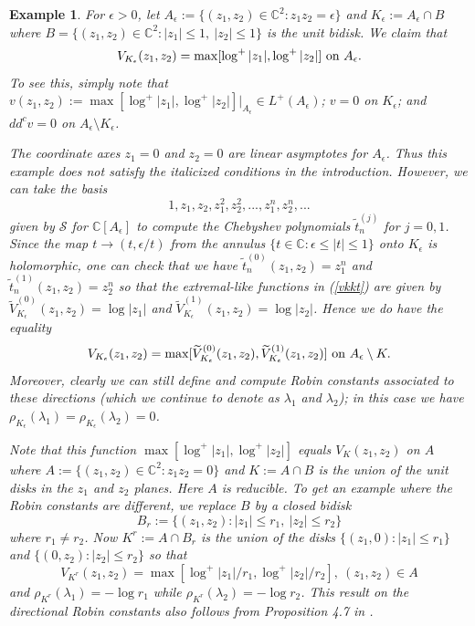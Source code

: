 \documentclass[12pt]{article}
\numberwithin{equation}{section}
\newtheorem{Example}[theorem]{Example}
\newenvironment{example}{\begin{Example}\rm}{\end{Example}}
\newcommand{\C}{\mathbb{C}}
\renewcommand{\tilde}{\widetilde}
\newcommand{\calS}{\mathcal{S}}
\begin{document}
\begin{example}  For $\epsilon >0$, let $A_{\epsilon}:=\{(z_1,z_2)\in \C^2: z_1 z_2 = \epsilon\}$ and $K_{\epsilon}:=A_{\epsilon}\cap B$ where $B=\{(z_1,z_2)\in \C^2: |z_1|\leq 1, \ |z_2|\leq  1\}$ is the unit bidisk. We claim that 
$$V_{K_{\epsilon}}(z_1,z_2) = \max[ \log^+|z_1|, \log^+|z_2|] \ \hbox{on}  \ A_{\epsilon}.$$ To see this, simply note that $v(z_1,z_2):=\max[ \log^+|z_1|, \log^+|z_2|]|_{A_{\epsilon}}\in L^+(A_{\epsilon})$; $v=0$ on $K_{\epsilon}$; and $dd^cv=0$ on $A_{\epsilon}\setminus K_{\epsilon}$. 

The coordinate axes $z_1=0$ and $z_2=0$ are linear asymptotes for $A_{\epsilon}$. Thus this example does not satisfy the italicized conditions in the introduction. However, we can take the basis
$$1,z_1,z_2,z_1^2,z_2^2,...,z_1^n,z_2^n,...$$
given by $\calS$ for $\C[A_{\epsilon}]$ to compute the Chebyshev polynomials $\tilde t_n^{(j)}$ for $j=0,1$. Since the map $t\to (t, \epsilon/t)$ from the annulus $\{t\in \C: \epsilon \leq |t| \leq 1\}$ onto $K_{\epsilon}$ is holomorphic, one can check that we have $\tilde t_n^{(0)}(z_1,z_2)=z_1^n$ and $\tilde t_n^{(1)}(z_1,z_2)=z_2^n$ so that the extremal-like functions in (\ref{vkkt}) are given by $\tilde V_{K_{\epsilon}}^{(0)}(z_1,z_2)= \log|z_1|$ and  $\tilde V_{K_{\epsilon}}^{(1)}(z_1,z_2)= \log|z_2|$. Hence we do have the equality 
$$V_{K_{\epsilon}}(z_1,z_2)=\max[\tilde V_{K_{\epsilon}}^{(0)}(z_1,z_2),\tilde V_{K_{\epsilon}}^{(1)}(z_1,z_2)] \ \hbox{on} \  A_{\epsilon}\setminus K.$$
Moreover, clearly we can still define and compute Robin constants associated to these directions (which we continue to denote as $\lambda_1$ and $\lambda_2$); in this case we have
$\rho_{K_{\epsilon}}(\lambda_1) =\rho_{K_{\epsilon}}(\lambda_2)=0$. 

Note that this function $ \max[ \log^+|z_1|, \log^+|z_2|]$ equals $V_K(z_1,z_2)$ on $A$ where $A:=\{(z_1,z_2)\in \C^2: z_1 z_2 = 0 \}$ and $K:=A\cap B$ is the union of the unit disks in the $z_1$ and $z_2$ planes. Here $A$ is reducible. To get an example where the Robin constants are different, we replace $B$ by a closed bidisk 
$$B_r:=\{(z_1,z_2): |z_1|\leq r_1, \ |z_2|\leq r_2\}$$
where $r_1 \not = r_2$. Now $K^r:=A\cap B_r$ is the union of the disks $\{(z_1,0):|z_1|\leq r_1\}$ and $\{(0,z_2):|z_2|\leq r_2\}$ so that 
$$V_{K^r}(z_1,z_2)=\max[\log^+ |z_1|/r_1, \log^+ |z_2|/r_2], \ (z_1,z_2)\in A$$
and $\rho_{K^r}(\lambda_1) =-\log r_1$ while $\rho_{K^r}(\lambda_2)=-\log r_2$. This result on the directional Robin constants also follows from Proposition 4.7 in \cite{M}. 


\end{example}
\end{document}
